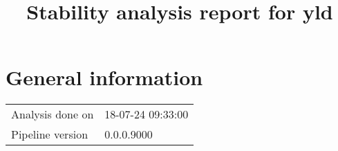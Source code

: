 \documentclass[a4paper,11pt]{article}\usepackage[]{graphicx}\usepackage[]{color}
\title{Stability analysis report for yld}%
\author{\vspace{-5ex}}
\date{\vspace{-5ex}}
\begin{document}
\maketitle
\singlespacing

\section{General information}
\begin{table}[ht]
\begin{flushleft}
\begin{tabular}{ll}
  Analysis done on & 18-07-24 09:33:00 \\ 
  Pipeline version & 0.0.0.9000 \\ 
  \end{tabular}
\label{general}
\end{flushleft}
\end{table}


\end{document}
